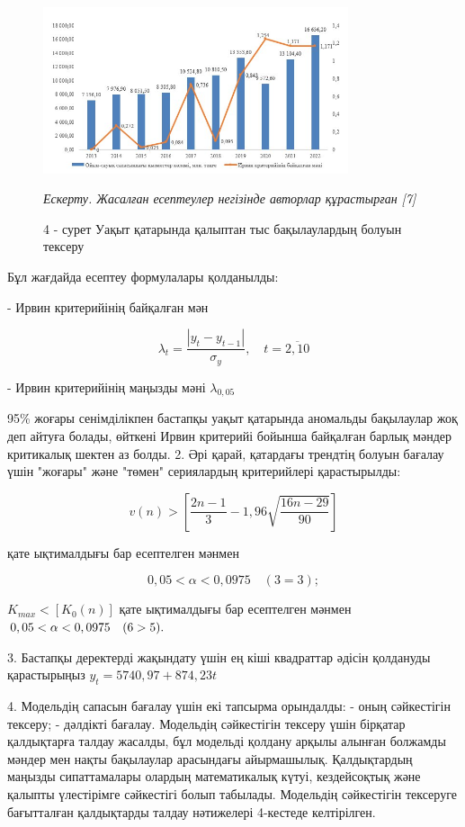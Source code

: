 \begin{figure}[H]
	\centering
	\includegraphics[width=0.8\textwidth]{media/ekon/image6.4}
	\caption*{4 - сурет Уақыт қатарында қалыптан тыс бақылаулардың болуын
  тексеру}
  \emph{Ескерту. Жасалған есептеулер негізінде авторлар құрастырған {[}7{]}}
\end{figure}

\begin{multicols}{2}

Бұл жағдайда есептеу формулалары қолданылды:

- Ирвин критерийінің байқалған мән

\begin{equation*}
\lambda_t=\frac{|y_t-y_{t-1}|}{\sigma_y},\quad t=\overline{2, 10}
\end{equation*}

- Ирвин критерийінің маңызды мәні $\lambda_{0,05}$

95\% жоғары сенімділікпен бастапқы уақыт қатарында аномальды бақылаулар
жоқ деп айтуға болады, өйткені Ирвин критерийі бойынша байқалған барлық
мәндер критикалық шектен аз болды. 2. Әрі қарай, қатардағы трендтің
болуын бағалау үшін "жоғары" және "төмен" сериялардың критерийлері
қарастырылды:

\begin{equation*}
v(n)>[\frac{2n-1}{3}-1,96\sqrt{\frac{16n-29}{90}}]
\end{equation*}

қате ықтималдығы бар есептелген мәнмен

\begin{equation*}
0,05 < \alpha < 0,0975 \quad (3=3);
\end{equation*}

$K_{max}<[K_0(n)]$ қате ықтималдығы бар есептелген мәнмен $0,05 < \alpha < 0,0975 \quad \linebreak (6>5).$

3. Бастапқы деректерді жақындату үшін ең кіші квадраттар әдісін
қолдануды қарастырыңыз $y_t=5740,97+874,23t$

4. Модельдің сапасын бағалау үшін екі тапсырма орындалды: - оның
сәйкестігін тексеру; - дәлдікті бағалау. Модельдің сәйкестігін тексеру
үшін бірқатар қалдықтарға талдау жасалды, бұл модельді қолдану арқылы
алынған болжамды мәндер мен нақты бақылаулар арасындағы айырмашылық.
Қалдықтардың маңызды сипаттамалары олардың математикалық күтуі,
кездейсоқтық және қалыпты үлестірімге сәйкестігі болып табылады.
Модельдің сәйкестігін тексеруге бағытталған қалдықтарды талдау
нәтижелері 4-кестеде келтірілген.
\end{multicols}

